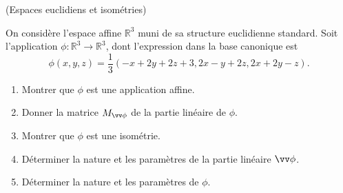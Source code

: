 \documentclass[a4paper,12pt,reqno]{amsart}
\begin{document}
\sisujet{\newpage}
\begin{exo} (Espaces euclidiens et isométries)

  On considère l'espace affine $\mathbb{R}^{3}$ muni de sa structure euclidienne standard. Soit l'application $\phi : \mathbb{R}^{3} \rightarrow \mathbb{R}^{3}$, dont l'expression dans la base canonique est
  \[
    \phi(x,y,z) = \frac{1}{3}(-x+2y+2z+3,2x-y+2z,2x+2y-z).
  \]

  \begin{enumerate}
    \item Montrer que $\phi$ est une application affine.
    \item Donner la matrice $M_{\vv\phi}$ de la partie linéaire de $\phi$.
    \item Montrer que $\phi$ est une isométrie.
    \item Déterminer la nature et les paramètres de la partie linéaire $\vv\phi$.
    \item Déterminer la nature et les paramètres de $\phi$.
  \end{enumerate}
\end{exo}
\end{document}
